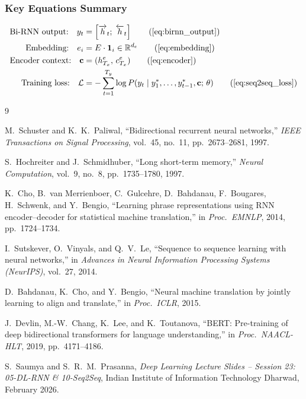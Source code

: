 \documentclass[12pt,a4paper]{article}
\begin{document}
\subsubsection*{Key Equations Summary}

\begin{align}
  \text{Bi-RNN output:} \quad
  y_t &= \left[\overrightarrow{h}_t;\;\overleftarrow{h}_t\right] \tag{\ref{eq:birnn_output}} \\
  \text{Embedding:} \quad
  e_i &= E\cdot\mathbf{1}_i \in \mathbb{R}^{d_e} \tag{\ref{eq:embedding}} \\
  \text{Encoder context:} \quad
  \mathbf{c} &= (h^e_{T_x},\, c^e_{T_x}) \tag{\ref{eq:encoder}} \\
  \text{Training loss:} \quad
  \mathcal{L} &= -\sum_{t=1}^{T_y}
    \log P(y_t \mid y^*_1, \ldots, y^*_{t-1}, \mathbf{c};\,\theta)
    \tag{\ref{eq:seq2seq_loss}}
\end{align}

\begin{thebibliography}{9}

M.\ Schuster and K.\ K.\ Paliwal,
``Bidirectional recurrent neural networks,''
\textit{IEEE Transactions on Signal Processing},
vol.~45, no.~11, pp.~2673--2681, 1997.

S.\ Hochreiter and J.\ Schmidhuber,
``Long short-term memory,''
\textit{Neural Computation},
vol.~9, no.~8, pp.~1735--1780, 1997.

K.\ Cho, B.\ van Merrienboer, C.\ Gulcehre, D.\ Bahdanau, F.\ Bougares,
H.\ Schwenk, and Y.\ Bengio,
``Learning phrase representations using RNN encoder--decoder for statistical
machine translation,''
in \textit{Proc.\ EMNLP}, 2014, pp.~1724--1734.

I.\ Sutskever, O.\ Vinyals, and Q.\ V.\ Le,
``Sequence to sequence learning with neural networks,''
in \textit{Advances in Neural Information Processing Systems (NeurIPS)},
vol.~27, 2014.

D.\ Bahdanau, K.\ Cho, and Y.\ Bengio,
``Neural machine translation by jointly learning to align and translate,''
in \textit{Proc.\ ICLR}, 2015.

J.\ Devlin, M.-W.\ Chang, K.\ Lee, and K.\ Toutanova,
``BERT: Pre-training of deep bidirectional transformers for language
understanding,''
in \textit{Proc.\ NAACL-HLT}, 2019, pp.~4171--4186.

S.\ Saumya and S.\ R.\ M.\ Prasanna,
\textit{Deep Learning Lecture Slides -- Session 23: 05-DL-RNN \&
10-Seq2Seq},
Indian Institute of Information Technology Dharwad, February 2026.

\end{thebibliography}

\clearpage
\end{document}
